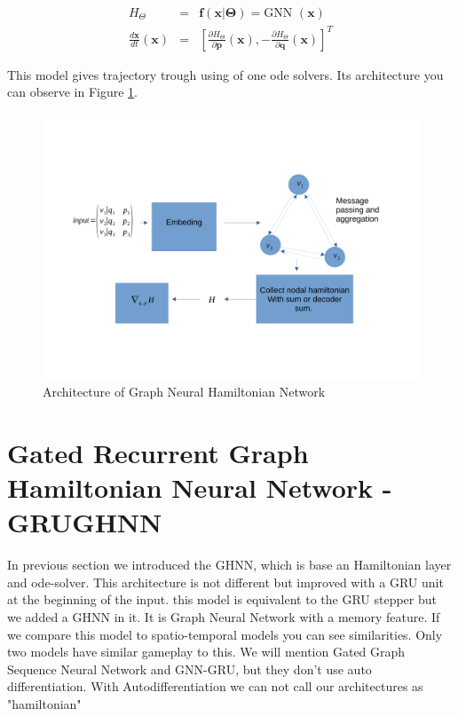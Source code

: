 \begin{eqnarray}
	H_{\Theta} &=& \mathbf{f}(\mathbf{x}|\boldsymbol{\Theta})=\text{GNN }(\mathbf{x})\\
	\frac{d\mathbf{x}}{dt}(\mathbf{x}) &=& \left[\frac{\partial H_{\Theta}}{\partial\mathbf{p}}(\mathbf{x}),-\frac{\partial H_{\Theta}}{\partial\mathbf{q}}(\mathbf{x})\right]^T
\end{eqnarray}

This model gives trajectory trough using of one ode solvers. Its architecture you can observe in Figure \ref{ghnn}.
\begin{figure}[h!]
	\includegraphics[width=15cm]{chapters/chapter4/ghnn}
	\caption{Architecture of Graph Neural Hamiltonian Network}
	\label{ghnn}
\end{figure}

\section{Gated Recurrent Graph Hamiltonian Neural Network - GRUGHNN}
In previous section we introduced the GHNN, which is base an Hamiltonian layer and ode-solver. This architecture is not different but improved with a GRU unit at the beginning of the input. this model is equivalent to the GRU stepper but we added a GHNN in it. It is Graph Neural Network with a memory feature. If we compare this model to spatio-temporal models you can see similarities. Only two models have similar gameplay to this. We will mention Gated Graph Sequence Neural Network\cite{GGSNN} and GNN-GRU\cite{gnngru}, but they don't use auto differentiation. With Autodifferentiation we can not call our architectures as "hamiltonian" 

